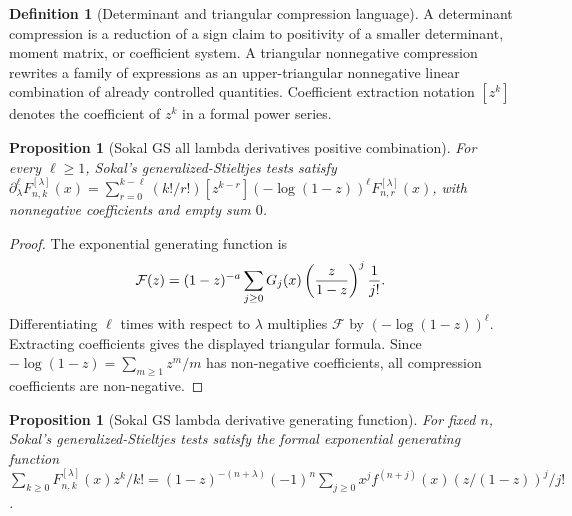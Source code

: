 \documentclass[11pt]{article}
\numberwithin{equation}{section}
\newtheorem{proposition}[theorem]{Proposition}
\theoremstyle{definition}
\newtheorem{definition}{Definition}[section]
\theoremstyle{remark}
\newcommand{\1}{\mathbf 1}
\begin{document}
\begin{definition}[Determinant and triangular compression language]
\label{res:determinant-triangular-compression-language}
A determinant compression is a reduction of a sign claim to positivity of a smaller determinant, moment matrix, or coefficient system. A triangular nonnegative compression rewrites a family of expressions as an upper-triangular nonnegative linear combination of already controlled quantities. Coefficient extraction notation \([z^k]\) denotes the coefficient of \(z^k\) in a formal power series.
\end{definition}

\begin{proposition}[Sokal GS all lambda derivatives positive combination]
\label{res:sokal-gs-all-lambda-derivatives-positive-combination}
For every \(\ell\ge1\), Sokal's generalized-Stieltjes tests satisfy \(\partial_\lambda^\ell F^{[\lambda]}_{n,k}(x)=\sum_{r=0}^{k-\ell}(k!/r!)[z^{k-r}](-\log(1-z))^\ell F^{[\lambda]}_{n,r}(x)\), with nonnegative coefficients and empty sum \(0\).
\end{proposition}

\begin{proof}
The exponential generating function is
\[
 \mathcal F(z)
 =(1-z)^{-a}\sum_{j\ge0}G_j(x)
      \left({z\over 1-z}\right)^j{1\over j!}.
\]
Differentiating \(\ell\) times with respect to \(\lambda\) multiplies
\(\mathcal F\) by \((-\log(1-z))^\ell\).  Extracting coefficients gives the
displayed triangular formula.  Since
\(-\log(1-z)=\sum_{m\ge1}z^m/m\) has non-negative coefficients, all compression
coefficients are non-negative.
\end{proof}

\begin{proposition}[Sokal GS lambda derivative generating function]
\label{res:sokal-gs-lambda-derivative-generating-function}
For fixed \(n\), Sokal's generalized-Stieltjes tests satisfy the formal exponential generating function \(\sum_{k\ge0}F^{[\lambda]}_{n,k}(x)z^k/k!=(1-z)^{-(n+\lambda)}(-1)^n\sum_{j\ge0}x^j f^{(n+j)}(x)(z/(1-z))^j/j!\).
\end{proposition}
\end{document}
